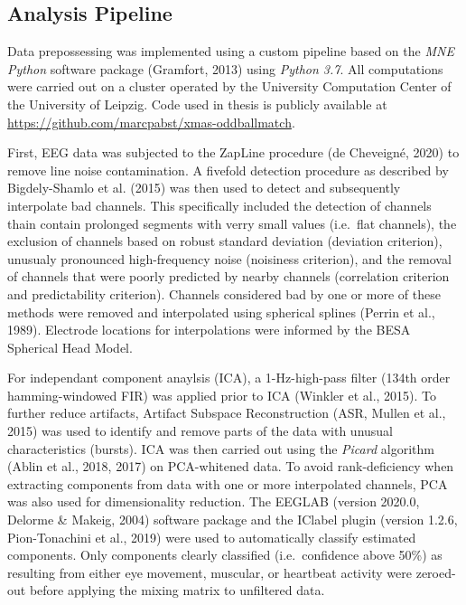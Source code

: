 \documentclass[stu,a4paper,12pt, nofontenc, babel, american]{apa7}
\begin{document}
\hypertarget{analysis-pipeline}{%
\subsection{Analysis Pipeline}\label{analysis-pipeline}}

Data prepossessing was implemented using a custom pipeline based on the
\emph{MNE Python} software package (Gramfort, 2013) using \emph{Python
3.7}. All computations were carried out on a cluster operated by the
University Computation Center of the University of Leipzig. Code used in
thesis is publicly available at
\url{https://github.com/marcpabst/xmas-oddballmatch}.

First, EEG data was subjected to the ZapLine procedure (de Cheveigné,
2020) to remove line noise contamination. A fivefold detection procedure
as described by Bigdely-Shamlo et al. (2015) was then used to detect and
subsequently interpolate bad channels. This specifically included the
detection of channels thain contain prolonged segments with verry small
values (i.e.~flat channels), the exclusion of channels based on robust
standard deviation (deviation criterion), unusualy pronounced
high-frequency noise (noisiness criterion), and the removal of channels
that were poorly predicted by nearby channels (correlation criterion and
predictability criterion). Channels considered bad by one or more of
these methods were removed and interpolated using spherical splines
(Perrin et al., 1989). Electrode locations for interpolations were
informed by the BESA Spherical Head Model.

For independant component anaylsis (ICA), a 1-Hz-high-pass filter (134th
order hamming-windowed FIR) was applied prior to ICA (Winkler et al.,
2015). To further reduce artifacts, Artifact Subspace Reconstruction
(ASR, Mullen et al., 2015) was used to identify and remove parts of the
data with unusual characteristics (bursts). ICA was then carried out
using the \emph{Picard} algorithm (Ablin et al., 2018, 2017) on
PCA-whitened data. To avoid rank-deficiency when extracting components
from data with one or more interpolated channels, PCA was also used for
dimensionality reduction. The EEGLAB (version 2020.0, Delorme \& Makeig,
2004) software package and the IClabel plugin (version 1.2.6,
Pion-Tonachini et al., 2019) were used to automatically classify
estimated components. Only components clearly classified
(i.e.~confidence above 50\%) as resulting from either eye movement,
muscular, or heartbeat activity were zeroed-out before applying the
mixing matrix to unfiltered data.
\end{document}
